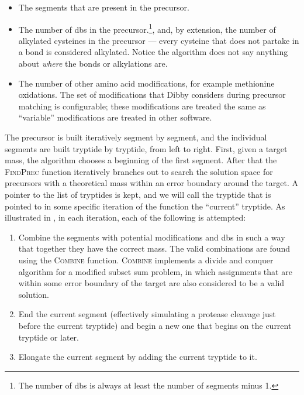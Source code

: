 \begin{itemize}
  \item The segments that are present in the precursor.
  \item The number of \glspl*{db} in the precursor.\footnote{The number of \glspl*{db} is always at least the number of segments minus 1.}, and, by extension, the number of alkylated cysteines in the precursor --- every cysteine that does not partake in a bond is considered alkylated. Notice the algorithm does not say anything about \emph{where} the bonds or alkylations are.
  \item The number of other amino acid modifications, for example methionine oxidations. The set of modifications that Dibby considers during precursor matching is configurable; these modifications are treated the same as ``variable'' modifications are treated in other software.
\end{itemize}


The precursor is built iteratively segment by segment, and the individual segments are built tryptide by tryptide, from left to right. First, given a target mass, the algorithm chooses a beginning of the first segment. After that the \textsc{FindPrec} function iteratively branches out to search the solution space for precursors with a theoretical mass within an error boundary around the target. A pointer to the list of tryptides is kept, and we will call the tryptide that is pointed to in some specific iteration of the function the ``current'' tryptide. As illustrated in , in each iteration, each of the following is attempted:

\begin{enumerate}
  \item Combine the  segments with potential modifications and \glspl*{db} in such a way that together they have the correct mass. The valid combinations are found using the \textsc{Combine} function. \textsc{Combine} implements a divide and conquer algorithm for a modified subset sum problem, in which assignments that are within some error boundary of the target are also considered to be a valid solution.
  \item End the current segment (effectively simulating a protease cleavage just before the current tryptide) and begin a new one that begins on the current tryptide or later.
  \item Elongate the current segment by adding the current tryptide to it.
\end{enumerate}

